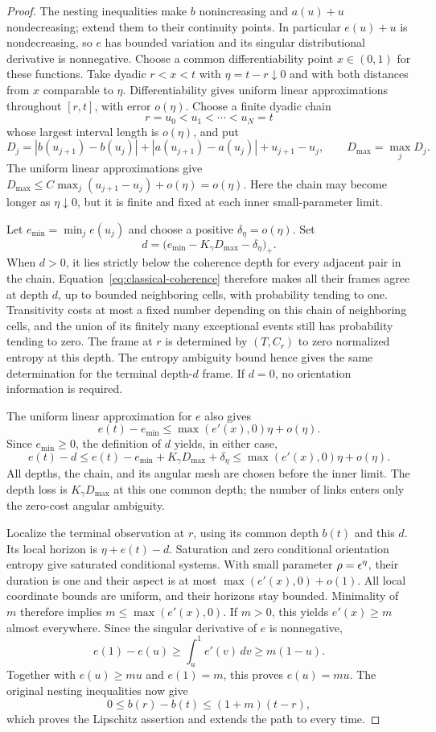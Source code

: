 \begin{proof}
The nesting inequalities make $b$ nonincreasing and $a(u)+u$
nondecreasing; extend them to their continuity points.  In particular
$e(u)+u$ is nondecreasing, so $e$ has bounded variation and its singular
distributional derivative is nonnegative.  Choose a common differentiability
point $x\in(0,1)$ for these functions.
Take dyadic $r<x<t$ with $\eta=t-r\downarrow0$ and with both distances
from $x$ comparable to $\eta$.  Differentiability gives uniform linear
approximations throughout $[r,t]$, with error $o(\eta)$.  Choose a finite
dyadic chain
\[
 r=u_0<u_1<\cdots<u_N=t
\]
whose largest interval length is $o(\eta)$, and put
\[
 D_j=|b(u_{j+1})-b(u_j)|+|a(u_{j+1})-a(u_j)|+u_{j+1}-u_j,
 \qquad D_{\max}=\max_jD_j.
\]
The uniform linear approximations give
$D_{\max}\le C\max_j(u_{j+1}-u_j)+o(\eta)=o(\eta)$.
Here the chain may become longer as $\eta\downarrow0$, but it is finite
and fixed at each inner small-parameter limit.

Let $e_{\min}=\min_j e(u_j)$ and choose a positive
$\delta_\eta=o(\eta)$.  Set
\[
 d=\bigl(e_{\min}-K_\gamma D_{\max}-\delta_\eta\bigr)_+.
\]
When $d>0$, it lies strictly below the coherence depth for every adjacent
pair in the chain.  Equation~\eqref{eq:classical-coherence} therefore
makes all their frames agree at depth $d$, up to bounded neighboring
cells, with probability tending to one.  Transitivity costs at most a
fixed number depending on this chain of neighboring cells, and the union
of its finitely many exceptional events still has probability tending
to zero.  The frame at $r$ is determined by $(T,C_r)$ to zero normalized
entropy at this depth.  The entropy ambiguity bound hence gives the same
determination for the terminal depth-$d$ frame.  If $d=0$, no orientation
information is required.

The uniform linear approximation for $e$ also gives
\[
 e(t)-e_{\min}\le\max(e'(x),0)\eta+o(\eta).
\]
Since $e_{\min}\ge0$, the definition of $d$ yields, in either case,
\[
 e(t)-d\le e(t)-e_{\min}+K_\gamma D_{\max}+\delta_\eta
       \le\max(e'(x),0)\eta+o(\eta).
\]
All depths, the chain, and its angular mesh are chosen before the inner
limit.  The depth loss is $K_\gamma D_{\max}$ at this one common depth;
the number of links enters only the zero-cost angular ambiguity.

Localize the terminal observation at $r$, using its common depth $b(t)$
and this $d$.  Its local horizon is $\eta+e(t)-d$.  Saturation and zero
conditional orientation entropy give saturated conditional systems.
With small parameter $\rho=\epsilon^\eta$, their duration is one and their
aspect is at most $\max(e'(x),0)+o(1)$.  All local coordinate bounds are
uniform, and their horizons stay bounded.  Minimality of $m$ therefore
implies $m\le\max(e'(x),0)$.  If $m>0$, this yields $e'(x)\ge m$
almost everywhere.  Since the singular derivative of $e$ is
nonnegative,
\[
 e(1)-e(u)\ge\int_u^1 e'(v)\,dv\ge m(1-u).
\]
Together with $e(u)\ge mu$ and $e(1)=m$, this proves $e(u)=mu$.
The original nesting inequalities now give
\[
 0\le b(r)-b(t)\le(1+m)(t-r),
\]
which proves the Lipschitz assertion and extends the path to every time.


\end{proof}

